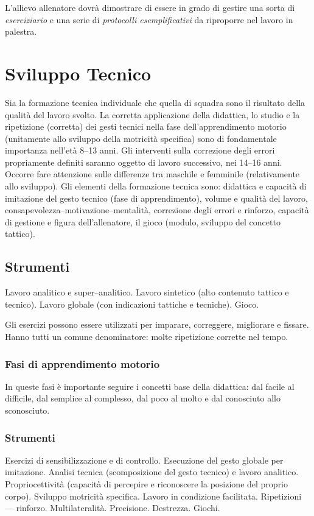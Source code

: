 \begin{libro}
L'allievo allenatore dovrà dimostrare di essere in grado di gestire una sorta
di \emph{eserciziario} e una serie di \emph{protocolli esemplificativi} da
riproporre nel lavoro in palestra.
\end{libro}

\section{Sviluppo Tecnico}\label{svtecnico}
Sia la formazione tecnica individuale che quella di squadra sono il risultato della qualità del lavoro svolto. La corretta applicazione della didattica, lo studio e la ripetizione (corretta) dei gesti tecnici nella fase dell'apprendimento motorio (unitamente allo sviluppo della motricità specifica) sono di fondamentale importanza nell'età 8--13 anni.
Gli interventi sulla correzione degli errori propriamente definiti saranno oggetto di lavoro successivo, nei 14--16 anni.
Occorre fare attenzione sulle differenze tra maschile e femminile (relativamente allo sviluppo).
Gli elementi della formazione tecnica sono: didattica e capacità di imitazione del gesto tecnico (fase di apprendimento), volume e qualità del lavoro,  consapevolezza--motivazione--mentalità, correzione degli errori e rinforzo, capacità di gestione e figura dell'allenatore, il gioco (modulo, sviluppo del concetto tattico).


\subsection{Strumenti}
Lavoro analitico e super--analitico.
Lavoro sintetico (alto contenuto tattico e tecnico).
Lavoro globale (con indicazioni tattiche e tecniche).
Gioco.

Gli esercizi possono essere utilizzati per imparare, correggere, migliorare e fissare. Hanno tutti un comune denominatore: molte ripetizione corrette nel tempo.

\subsubsection{Fasi di apprendimento motorio}
In queste fasi è importante seguire i concetti base della didattica: dal facile al difficile, dal semplice al complesso, dal poco al molto e dal conosciuto allo sconosciuto.

\subsubsection{Strumenti}
Esercizi di sensibilizzazione e di controllo.
Esecuzione del gesto globale per imitazione.
Analisi tecnica (scomposizione del gesto tecnico) e lavoro analitico.
Propriocettività (capacità di percepire e riconoscere la posizione del proprio corpo).
Sviluppo motricità specifica.
Lavoro in condizione facilitata.
Ripetizioni --- rinforzo.
Multilateralità.
Precisione.
Destrezza.
Giochi.


